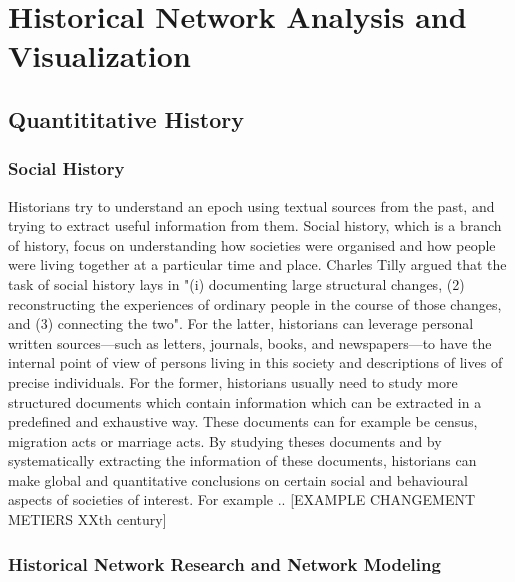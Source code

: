 
\chapter{Historical Network Analysis and Visualization}

\section{Quantititative History}

\subsection{Social History}

Historians try to understand an epoch using textual sources from the past, and trying to extract useful information from them.
Social history, which is a branch of history, focus on understanding how societies were organised and how people were living together at a particular time and place. Charles Tilly argued that the task of social history lays in "(i) documenting large structural changes, (2) reconstructing the experiences of ordinary people in the course of those changes, and (3) connecting the two". For the latter, historians can leverage personal written sources---such as letters, journals, books, and newspapers---to have the internal point of view of persons living in this society and descriptions of lives of precise individuals.
For the former, historians usually need to study more structured documents which contain information which can be extracted in a predefined and exhaustive way. These documents can for example be census, migration acts or marriage acts. By studying theses documents and by systematically extracting the information of these documents, historians can make global and quantitative conclusions on certain social and behavioural aspects of societies of interest.
For example .. [EXAMPLE CHANGEMENT METIERS XXth century]

\subsection{Historical Network Research and Network Modeling}

